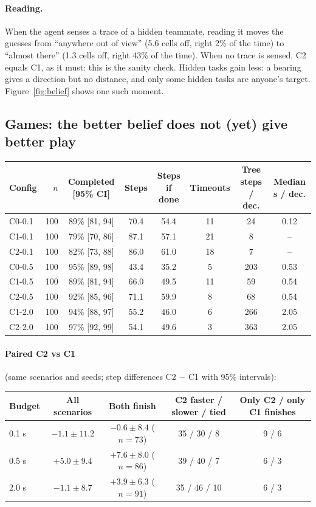 \documentclass[11pt,a4paper]{article}
\theoremstyle{remark}
\begin{document}
\paragraph{Reading.} When the agent senses a trace of a hidden teammate, reading it moves the guesses from ``anywhere out
of view'' (5.6 cells off, right 2\% of the time) to ``almost there'' (1.3 cells off, right 43\% of the time). When no
trace is sensed, C2 equals C1, as it must: this is the sanity check. Hidden tasks gain less: a bearing gives a direction
but no distance, and only some hidden tasks are anyone's target. Figure~\ref{fig:belief} shows one such moment.

\subsection{Games: the better belief does not (yet) give better play}

\begin{center}
\footnotesize\setlength{\tabcolsep}{3.5pt}
\begin{tabular}{lrcccccc}
\toprule
Config & $n$ & Completed [95\% CI] & Steps & Steps if done & Timeouts & Tree steps / dec. & Median s / dec. \\
\midrule
C0-0.1 & 100 & 89\% [81, 94] & 70.4 & 54.4 & 11 & 24 & 0.12 \\
C1-0.1 & 100 & 79\% [70, 86] & 87.1 & 57.1 & 21 & 8 & -- \\
C2-0.1 & 100 & 82\% [73, 88] & 86.0 & 61.0 & 18 & 7 & -- \\
C0-0.5 & 100 & 95\% [89, 98] & 43.4 & 35.2 & 5 & 203 & 0.53 \\
C1-0.5 & 100 & 89\% [81, 94] & 66.0 & 49.5 & 11 & 59 & 0.54 \\
C2-0.5 & 100 & 92\% [85, 96] & 71.1 & 59.9 & 8 & 68 & 0.54 \\
C1-2.0 & 100 & 94\% [88, 97] & 55.2 & 46.0 & 6 & 266 & 2.05 \\
C2-2.0 & 100 & 97\% [92, 99] & 54.1 & 49.6 & 3 & 363 & 2.05 \\
\bottomrule
\end{tabular}
\end{center}

\paragraph{Paired C2 vs C1} (same scenarios and seeds; step differences C2 $-$ C1 with 95\% intervals):
\begin{center}
\small
\begin{tabular}{lcccc}
\toprule
Budget & All scenarios & Both finish & C2 faster / slower / tied & Only C2 / only C1 finishes\\
\midrule
0.1 s & $-1.1 \pm 11.2$ & $-0.6\pm 8.4$ ($n=73$) & 35 / 30 / 8 & 9 / 6\\
0.5 s & $+5.0 \pm 9.4$ & $+7.6\pm 8.0$ ($n=86$) & 39 / 40 / 7 & 6 / 3\\
2.0 s & $-1.1 \pm 8.7$ & $+3.9\pm 6.3$ ($n=91$) & 35 / 46 / 10 & 6 / 3\\
\bottomrule
\end{tabular}
\end{center}
\end{document}
